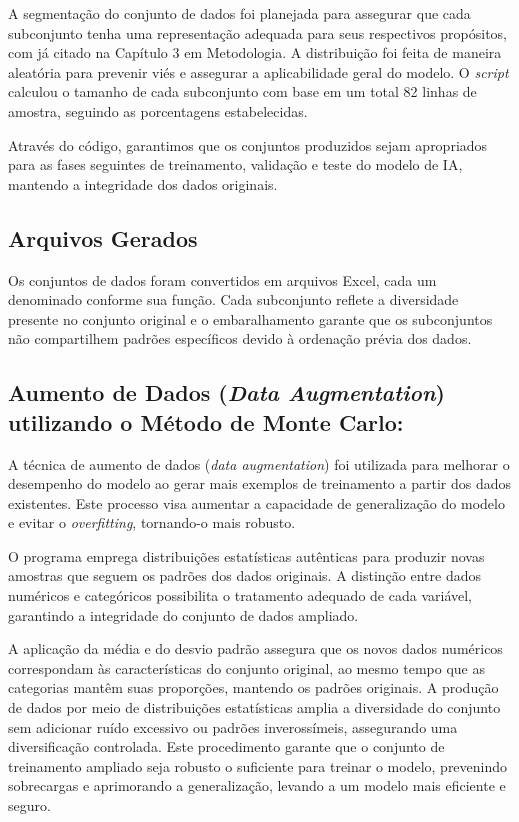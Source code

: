 A segmentação do conjunto de dados foi planejada para assegurar que cada subconjunto tenha uma representação adequada para seus respectivos propósitos, com já citado na Capítulo 3 em Metodologia. A distribuição foi feita de maneira aleatória para prevenir viés e assegurar a aplicabilidade geral do modelo. O \textit{script} calculou o tamanho de cada subconjunto com base em um total 82 linhas de amostra, seguindo as porcentagens estabelecidas.

Através do código, garantimos que os conjuntos produzidos sejam apropriados para as fases seguintes de treinamento, validação e teste do modelo de IA, mantendo a integridade dos dados originais.

\subsection*{Arquivos Gerados}
Os conjuntos de dados foram convertidos em arquivos Excel, cada um denominado conforme sua função. Cada subconjunto reflete a diversidade presente no conjunto original e o embaralhamento garante que os subconjuntos não compartilhem padrões específicos devido à ordenação prévia dos dados.

\subsection*{Aumento de Dados (\textit{Data Augmentation}) utilizando o Método de Monte Carlo:} 
A técnica de aumento de dados (\textit{data augmentation}) foi utilizada para melhorar o desempenho do modelo ao gerar mais exemplos de treinamento a partir dos dados existentes. Este processo visa aumentar a capacidade de generalização do modelo e evitar o \textit{overfitting}, tornando-o mais robusto.

O programa emprega distribuições estatísticas autênticas para produzir novas amostras que seguem os padrões dos dados originais. A distinção entre dados numéricos e categóricos possibilita o tratamento adequado de cada variável, garantindo a integridade do conjunto de dados ampliado.

A aplicação da média e do desvio padrão assegura que os novos dados numéricos correspondam às características do conjunto original, ao mesmo tempo que as categorias mantêm suas proporções, mantendo os padrões originais. A produção de dados por meio de distribuições estatísticas amplia a diversidade do conjunto sem adicionar ruído excessivo ou padrões inverossímeis, assegurando uma diversificação controlada. Este procedimento garante que o conjunto de treinamento ampliado seja robusto o suficiente para treinar o modelo, prevenindo sobrecargas e aprimorando a generalização, levando a um modelo mais eficiente e seguro.

